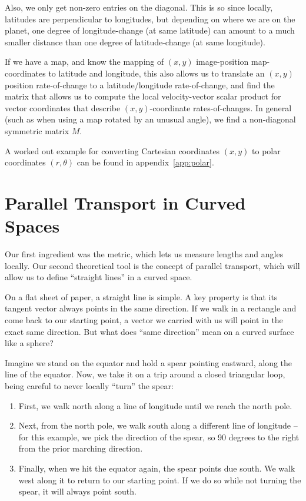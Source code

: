 \documentclass[twocolumn]{article}
\providecommand{\tightlist}{%
   \setlength{\itemsep}{0pt}\setlength{\parskip}{0pt}}
\begin{document}
Also, we only get non-zero entries on the diagonal.
This is so since locally, latitudes are perpendicular to longitudes,
but depending on where we are on the planet, one degree of
longitude-change (at same latitude) can amount to a much smaller
distance than one degree of latitude-change (at same longitude).

If we have a map, and know the mapping of \((x,y)\) image-position
map-coordinates to latitude and longitude, this also allows us to
translate an \((x,y)\) position rate-of-change to a latitude/longitude
rate-of-change, and find the matrix that allows us to compute the local
velocity-vector scalar product for vector coordinates that describe
\((x,y)\)-coordinate rates-of-changes. In general
(such as when using a map rotated by an unusual angle), we
find a non-diagonal symmetric matrix \(M\).

A worked out example for converting Cartesian coordinates \((x,y)\) to polar
coordinates \((r, \theta)\) can be found in appendix~\ref{app:polar}.
  
\section{Parallel Transport in Curved Spaces}\label{sec:parallel}

Our first ingredient was the metric, which lets us measure lengths and
angles locally. Our second theoretical tool is the concept of
parallel transport, which will allow us to define ``straight lines'' in
a curved space.

On a flat sheet of paper, a straight line is simple. A key property is
that its tangent vector always points in the same direction. If we walk
in a rectangle and come back to our starting point, a vector we
carried with us will point in the exact same direction. But what does
``same direction'' mean on a curved surface like a sphere?

Imagine we stand on the equator and hold a spear pointing eastward,
along the line of the equator. Now, we take it on a trip around a
closed triangular loop, being careful to never locally ``turn'' the
spear:

\begin{enumerate}
\def\labelenumi{\arabic{enumi}.}
\tightlist
\item
  First, we walk north along a line of longitude until we reach the
  north pole.
\item
  Next, from the north pole, we walk south along a different line of
  longitude -- for this example, we pick the direction of the spear, so
  90 degrees to the right from the prior marching direction.
\item
  Finally, when we hit the equator again, the spear points due south.
  We walk west along it to return to our starting point. If we do so
  while not turning the spear, it will always point south.
\end{enumerate}
\end{document}
